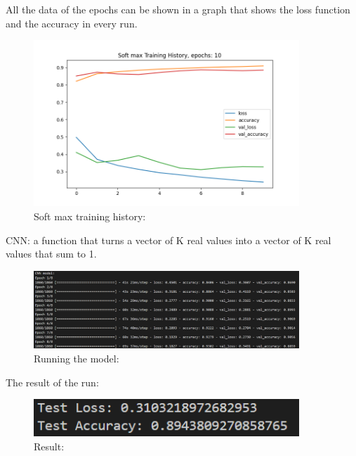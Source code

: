\documentclass{article}
\begin{document}
All the data of the epochs can be shown in a graph that shows the loss function and the accuracy in every run.
\begin{figure}[H]
    \caption{Soft max training history:}
    \centering
    \includegraphics[width=10cm]{softmax.png}
\end{figure}


CNN: a function that turns a vector of K real values into a vector of K real values that sum to 1.
\begin{figure}[H]
    \caption{Running the model:}
    \centering
    \includegraphics[width=10cm]{imgFolder/RunningCNNModel.png}
\end{figure}
The result of the run:
\begin{figure}[H]
    \caption{Result:}
    \centering
    \includegraphics[width=10cm]{imgFolder/softMaxResult.png}
\end{figure}
\end{document}

